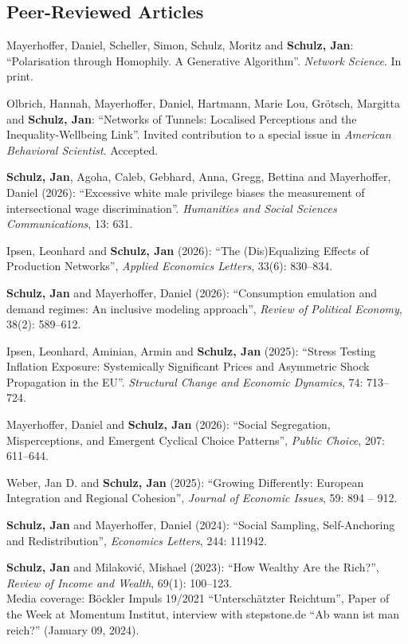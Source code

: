 \documentclass[margin]{res}
\begin{document}
\begin{resume}
	\section{Peer-Reviewed Articles}
	Mayerhoffer, Daniel, Scheller, Simon, Schulz, Moritz and \textbf{Schulz, Jan}: ``Polarisation through Homophily. A Generative Algorithm''. \textit{Network Science}. In print. 
	
	Olbrich, Hannah, Mayerhoffer, Daniel, Hartmann, Marie Lou, Gr\"otsch, Margitta and \textbf{Schulz, Jan}: ``Networks of Tunnels: Localised Perceptions and the Inequality-Wellbeing Link''. Invited contribution to a special issue in \textit{American Behavioral Scientist}. Accepted.
	
	\textbf{Schulz, Jan}, Agoha, Caleb, Gebhard, Anna, Gregg, Bettina and Mayerhoffer, Daniel (2026): ``Excessive white male privilege biases the measurement of intersectional wage discrimination''. \textit{Humanities and Social Sciences Communications}, 13: 631.
	
	Ipsen, Leonhard and \textbf{Schulz, Jan} (2026): ``The (Dis)Equalizing Effects of Production Networks'', \emph{Applied Economics Letters}, 33(6): 830--834.
	
	\textbf{Schulz, Jan} and Mayerhoffer, Daniel (2026): ``Consumption emulation and demand regimes: An inclusive modeling approach'', \textit{Review of Political Economy}, 38(2): 589--612.
	
	Ipsen, Leonhard, Aminian, Armin and \textbf{Schulz, Jan} (2025): ``Stress Testing Inflation Exposure: Systemically Significant Prices and Asymmetric Shock Propagation in the EU''. \textit{Structural Change and Economic Dynamics}, 74: 713--724.
	
	Mayerhoffer, Daniel and \textbf{Schulz, Jan} (2026): ``Social Segregation, Misperceptions, and Emergent Cyclical Choice Patterns'', \emph{Public Choice}, 207: 611--644.
	
	Weber, Jan D. and \textbf{Schulz, Jan} (2025): ``Growing Differently: European Integration and Regional Cohesion'', \emph{Journal of Economic Issues}, 59: 894 -- 912.
	
	\textbf{Schulz, Jan} and Mayerhoffer, Daniel (2024): ``Social Sampling, Self-Anchoring and Redistribution'', \emph{Economics Letters}, 244: 111942.
	
	
	\textbf{Schulz, Jan} and Milakovi\'c, Mishael (2023): ``How Wealthy Are the Rich?'', \textit{Review of Income and Wealth}, 69(1): 100--123.\\
	Media coverage: B\"ockler Impuls 19/2021 ``Untersch\"atzter Reichtum'', Paper of the Week at Momentum Institut, interview with stepstone.de ``Ab wann ist man reich?'' (January 09, 2024).
	

\end{resume}
\end{document}
